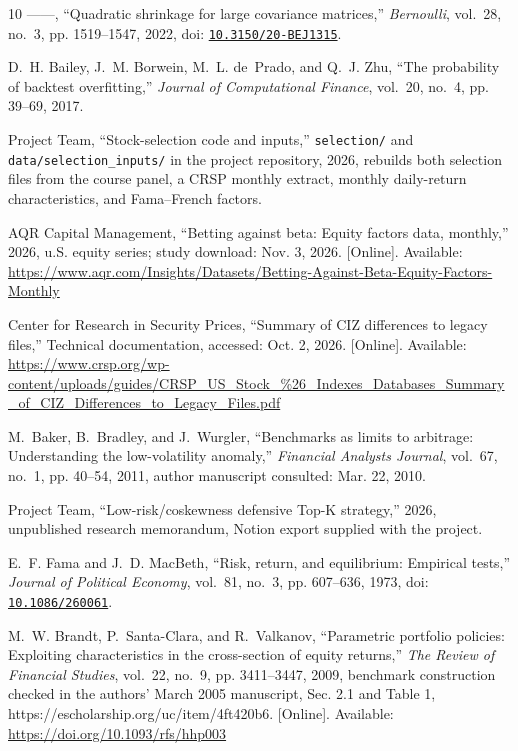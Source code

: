 \documentclass[letterpaper,journal]{IEEEtran}
\begin{document}
\begin{thebibliography}{10}
------, ``Quadratic shrinkage for large covariance matrices,''
  \emph{Bernoulli}, vol.~28, no.~3, pp. 1519--1547, 2022, doi:
  \href{https://doi.org/10.3150/20-BEJ1315}{\nolinkurl{10.3150/20-BEJ1315}}.

D.~H. Bailey, J.~M. Borwein, M.~L. de~Prado, and Q.~J. Zhu, ``The probability
  of backtest overfitting,'' \emph{Journal of Computational Finance}, vol.~20,
  no.~4, pp. 39--69, 2017.

{Project Team}, ``Stock-selection code and inputs,'' \texttt{selection/} and
  \texttt{data/selection\_inputs/} in the project repository, 2026, rebuilds
  both selection files from the course panel, a CRSP monthly extract, monthly
  daily-return characteristics, and Fama--French factors.

\BIBentryALTinterwordspacing
{AQR Capital Management}, ``Betting against beta: Equity factors data,
  monthly,'' 2026, u.S. equity series; study download: Nov. 3, 2026. [Online].
  Available:
  \url{https://www.aqr.com/Insights/Datasets/Betting-Against-Beta-Equity-Factors-Monthly}
\BIBentrySTDinterwordspacing

\BIBentryALTinterwordspacing
{Center for Research in Security Prices}, ``Summary of {CIZ} differences to
  legacy files,'' Technical documentation, accessed: Oct. 2, 2026. [Online].
  Available:
  \url{https://www.crsp.org/wp-content/uploads/guides/CRSP_US_Stock_\%26_Indexes_Databases_Summary_of_CIZ_Differences_to_Legacy_Files.pdf}
\BIBentrySTDinterwordspacing

M.~Baker, B.~Bradley, and J.~Wurgler, ``Benchmarks as limits to arbitrage:
  Understanding the low-volatility anomaly,'' \emph{Financial Analysts
  Journal}, vol.~67, no.~1, pp. 40--54, 2011, author manuscript consulted: Mar.
  22, 2010.

{Project Team}, ``Low-risk/coskewness defensive {Top-K} strategy,'' 2026,
  unpublished research memorandum, Notion export supplied with the project.

E.~F. Fama and J.~D. MacBeth, ``Risk, return, and equilibrium: Empirical
  tests,'' \emph{Journal of Political Economy}, vol.~81, no.~3, pp. 607--636,
  1973, doi: \href{https://doi.org/10.1086/260061}{\nolinkurl{10.1086/260061}}.

\BIBentryALTinterwordspacing
M.~W. Brandt, P.~Santa-Clara, and R.~Valkanov, ``Parametric portfolio policies:
  Exploiting characteristics in the cross-section of equity returns,''
  \emph{The Review of Financial Studies}, vol.~22, no.~9, pp. 3411--3447, 2009,
  benchmark construction checked in the authors' March 2005 manuscript, Sec.
  2.1 and Table 1, https://escholarship.org/uc/item/4ft420b6. [Online].
  Available: \url{https://doi.org/10.1093/rfs/hhp003}
\BIBentrySTDinterwordspacing


\end{thebibliography}
\end{document}

